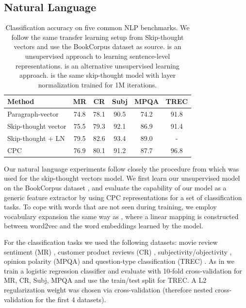 \subsection{Natural Language}

\begin{table}[ht]
  \centering
  \begin{tabularx}{0.73\textwidth}{l|c|c|c|c|c}
    \toprule
    \textbf{Method} & \textbf{MR} & \textbf{CR} & \textbf{Subj} & \textbf{MPQA} & \textbf{TREC}  \\
    \midrule\midrule
    Paragraph-vector \cite{le2014distributed} & 74.8 & 78.1 & 90.5 & 74.2 & 91.8 \\  
    Skip-thought vector \cite{kiros2015skip} & 75.5 & 79.3 & 92.1 & 86.9 & 91.4 \\
    Skip-thought + LN \cite{ba2016layernorm} & 79.5 & 82.6 & 93.4 & 89.0 & -	\\
    \midrule
    CPC & 76.9 & 80.1 & 91.2 &	87.7 & 96.8  \\
    \bottomrule
  \end{tabularx}
  \vspace{5pt}
  \caption{Classification accuracy on five common NLP benchmarks. We follow the same transfer learning setup from Skip-thought vectors \cite{kiros2015skip} and use the BookCorpus dataset as source. \cite{le2014distributed} is an unsupervised approach to learning sentence-level representations. \cite{kiros2015skip} is an alternative unsupervised learning approach. \cite{ba2016layernorm} is the same skip-thought model with layer normalization trained for 1M iterations.}
  \label{tab:textclass}
\end{table}%

Our natural language experiments follow closely the procedure from \cite{kiros2015skip} which was used for the skip-thought vectors model. We first learn our unsupervised model on the BookCorpus dataset \cite{zhu2015aligning}, and evaluate the capability of our model as a generic feature extractor by using CPC representations for a set of classification tasks.
To cope with words that are not seen during training, we employ vocabulary expansion the same way as \cite{kiros2015skip}, where a linear mapping is constructed between word2vec and the word embeddings learned by the model.

For the classification tasks we used the following datasets: movie review sentiment (MR) \cite{pang2005seeing}, customer product reviews (CR) \cite{hu2004mining}, subjectivity/objectivity \cite{pang2004sentimental}, opinion polarity (MPQA) \cite{wiebe2005annotating} and question-type classification (TREC) \cite{li2002learning}. As in \cite{kiros2015skip} we train a logistic regression classifier and evaluate with 10-fold cross-validation for MR, CR, Subj, MPQA and use the train/test split for TREC. A L2 regularization weight was chosen via cross-validation (therefore nested cross-validation for the first 4 datasets). 

